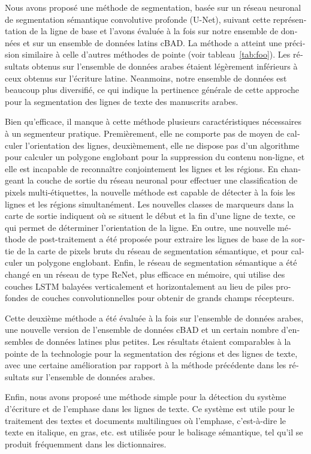 \begin{french}
Nous avons proposé une méthode de segmentation, basée sur un réseau neuronal de
segmentation sémantique convolutive profonde (U-Net), suivant cette
représentation de la ligne de base et l'avons évaluée à la fois sur notre ensemble de
données et sur un ensemble de données latins cBAD. La méthode a atteint une
précision similaire à celle d'autres méthodes de pointe (voir
tableau~\ref{tab:foo}). Les résultats obtenus sur l'ensemble de
données arabes étaient légèrement inférieurs à ceux obtenus sur l'écriture latine. Neanmoins, notre
ensemble de données est beaucoup plus diversifié, ce qui indique la pertinence
générale de cette approche pour la segmentation des lignes de texte des
manuscrits arabes.

Bien qu'efficace, il manque à cette méthode plusieurs caractéristiques
nécessaires à un segmenteur pratique. Premièrement, elle ne comporte pas de
moyen de calculer l'orientation des lignes, deuxièmement, elle ne dispose pas
d'un algorithme pour calculer un polygone englobant pour la suppression du
contenu non-ligne, et elle est incapable de reconnaître conjointement les
lignes et les régions. En changeant la couche de sortie du réseau neuronal pour
effectuer une classification de pixels multi-étiquettes, la nouvelle méthode
est capable de détecter à la fois les lignes et les régions simultanément. Les
nouvelles classes de marqueurs dans la carte de sortie indiquent où se situent le 
début et la fin d'une ligne de texte, ce qui permet de déterminer
l'orientation de la ligne. En outre, une nouvelle méthode de post-traitement a
été proposée pour extraire les lignes de base de la sortie de la carte de
pixels bruts du réseau de segmentation sémantique, et pour calculer un polygone
englobant. Enfin, le réseau de segmentation sémantique a été changé en un
réseau de type ReNet, plus efficace en mémoire, qui utilise des couches LSTM
balayées verticalement et horizontalement au lieu de piles profondes de couches
convolutionnelles pour obtenir de grands champs récepteurs.

Cette deuxième méthode a été évaluée à la fois sur l'ensemble de données
arabes, une nouvelle version de l'ensemble de données cBAD et un certain nombre
d'ensembles de données latines plus petites. Les résultats étaient comparables
à la pointe de la technologie pour la segmentation des régions et des lignes de
texte, avec une certaine amélioration par rapport à la méthode précédente dans
les résultats sur l'ensemble de données arabes.

Enfin, nous avons proposé une méthode simple pour la détection du système
d'écriture et de l'emphase dans les lignes de texte. Ce système est utile pour le
traitement des textes et documents multilingues où l'emphase, c'est-à-dire le
texte en italique, en gras, etc. est utilisée pour le balisage sémantique, tel
qu'il se produit fréquemment dans les dictionnaires.


\end{french}
